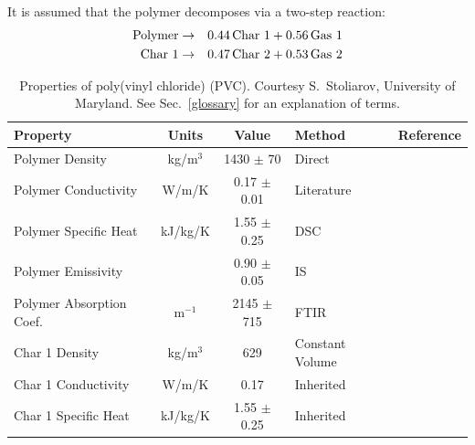 It is assumed that the polymer decomposes via a two-step reaction:
\begin{eqnarray}
   \hbox{Polymer} &\to& 0.44 \, \hbox{Char 1} + 0.56 \, \hbox{Gas 1}  \\
   \hbox{Char 1}  &\to& 0.47 \, \hbox{Char 2} + 0.53 \, \hbox{Gas 2}
\end{eqnarray}


\begin{table}[h!]
\caption[Properties of poly(vinyl chloride) (PVC)]{Properties of poly(vinyl chloride) (PVC). Courtesy S.~Stoliarov, University of Maryland. See Sec.~\ref{glossary} for an explanation of terms.}
\begin{center}
\begin{tabular}{|l|c|c|l|l|}
\hline
Property                    & Units         & Value                             & Method                    &  Reference                                \\ \hline \hline
Polymer Density             & kg/m$^3$      & 1430 $\pm$ 70                     & Direct                    &  \cite{Stoliarov:CF2010}                  \\ \hline
Polymer Conductivity        & W/m/K         & 0.17 $\pm$ 0.01                   & Literature                &  \cite{Stoliarov:CF2010}                  \\ \hline
Polymer Specific Heat       & kJ/kg/K       & 1.55 $\pm$ 0.25                   & DSC                       &  \cite{Stoliarov:PDS2008}                 \\ \hline
Polymer Emissivity          &               & 0.90 $\pm$ 0.05                   & IS                        &  \cite{Hallman:PES1974}                   \\ \hline
Polymer Absorption Coef.    & m$^{-1}$      & 2145 $\pm$ 715                    & FTIR                      &  \cite{Tsilingiris:ECM2003}               \\ \hline
Char 1 Density              & kg/m$^3$      & 629                               & Constant Volume           &  \cite{Stoliarov:CF2010}                  \\ \hline
Char 1 Conductivity         & W/m/K         & 0.17                              & Inherited                 &  \cite{Stoliarov:CF2010}                  \\ \hline
Char 1 Specific Heat        & kJ/kg/K       & 1.55 $\pm$ 0.25                   & Inherited                 &  \cite{Stoliarov:CF2010}                  \\ \hline

\end{tabular}
\end{center}
\end{table}
